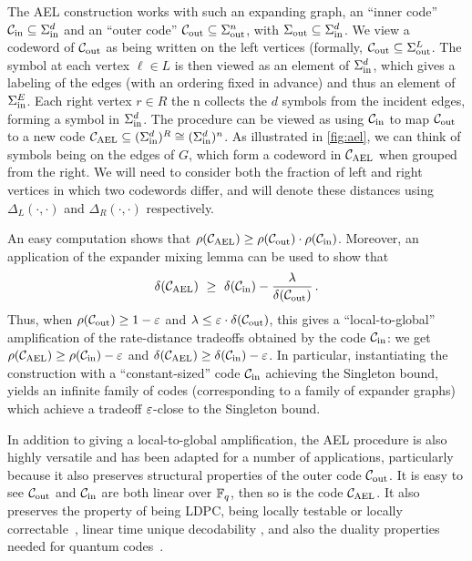 The AEL construction works with such an expanding graph, an ``inner code'' ${\mathcal C}_{\mathrm{in}} \subseteq \Sigma_{\mathrm{in}}^d$ and an ``outer code'' ${\mathcal C}_{\mathrm{out}} \subseteq \Sigma_{\mathrm{out}}^n$, with $\Sigma_{\mathrm{out}} \subseteq \Sigma_{\mathrm{in}}^d$. 
%
%
We view a codeword of ${\mathcal C}_{\mathrm{out}}$ as being written on the left vertices (formally, ${\mathcal C}_{\mathrm{out}} \subseteq \Sigma_{\mathrm{out}}^L$. The symbol at each vertex $\ell \in L$ is then viewed as an element of $\Sigma_{\mathrm{in}}^d$, which gives a labeling of the edges (with an ordering fixed in advance) and thus an element of $\Sigma_{\mathrm{in}}^E$. 
%
Each right vertex $r \in R$ the
n collects the $d$ symbols from the incident edges, forming a symbol in $\Sigma_{\mathrm{in}}^d$.
%
The procedure can be viewed as using ${\mathcal C}_{\mathrm{in}}$ to map ${\mathcal C}_{\mathrm{out}}$ to a new code ${ {\mathcal C}_{\mathrm{AEL}} } \subseteq (\Sigma_{\mathrm{in}}^d)^R \cong (\Sigma_{\mathrm{in}}^d)^n$.
%
As illustrated in \cref{fig:ael}, we can think of symbols being on the edges of $G$, which form a codeword in ${ {\mathcal C}_{\mathrm{AEL}} }$ when grouped from the right. We will need to consider both the fraction of left and right vertices in which two codewords differ, and will denote these distances using $\Delta_L(\cdot, \cdot)$ and $\Delta_R(\cdot , \cdot)$ respectively.

An easy computation shows that $\rho({ {\mathcal C}_{\mathrm{AEL}} }) \geq \rho({\mathcal C}_{\mathrm{out}}) \cdot \rho({\mathcal C}_{\mathrm{in}})$. Moreover, an application of the expander mixing lemma can be used to show that 
%
\[
\delta({ {\mathcal C}_{\mathrm{AEL}} }) ~\geq~ \delta({\mathcal C}_{\mathrm{in}}) - \frac{\lambda}{\delta({\mathcal C}_{\mathrm{out}})} \,.
\]
%
Thus, when $\rho({\mathcal C}_{\mathrm{out}}) \geq 1 - \varepsilon$ and $\lambda \leq \varepsilon \cdot \delta({\mathcal C}_{\mathrm{out}})$, this gives a ``local-to-global'' amplification of the rate-distance tradeoffs obtained by the code ${\mathcal C}_{\mathrm{in}}$:  we get $\rho({ {\mathcal C}_{\mathrm{AEL}} }) \geq \rho({\mathcal C}_{\mathrm{in}}) - \varepsilon$ and $\delta({ {\mathcal C}_{\mathrm{AEL}} }) \geq \delta({\mathcal C}_{\mathrm{in}}) - \varepsilon$. 
%
In particular, instantiating the construction with a ``constant-sized'' code ${\mathcal C}_{\mathrm{in}}$ achieving the Singleton bound, yields an infinite family of codes (corresponding to a family of expander graphs) which achieve a tradeoff $\varepsilon$-close to the Singleton bound. 

In addition to giving a local-to-global amplification, the AEL procedure is also highly versatile and has been adapted for a number of applications, particularly because it also preserves structural properties of the outer code ${\mathcal C}_{\mathrm{out}}$. 
%
It is easy to see ${\mathcal C}_{\mathrm{out}}$ and ${\mathcal C}_{\mathrm{in}}$ are both linear over ${\mathbb F}_q$, then so is the code ${ {\mathcal C}_{\mathrm{AEL}} }$. 
%
It also preserves the property of being LDPC, being locally testable or locally correctable~\cite{GKORZS17, KMRZS16}, linear time unique decodability \cite{GI05}, and also the duality properties needed for quantum codes~\cite{BGG24}. 

